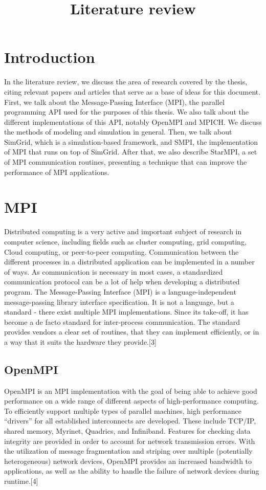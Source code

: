 \documentclass[a4paper]{article}
\begin{document}
\title{Literature review}
\maketitle
\section{Introduction}
In the literature review, we discuss the area of research covered by
the thesis, citing relevant papers and articles that serve as a base
of ideas for this document.\\
First, we talk about the Message-Passing Interface (MPI), the parallel
programming API used for the purposes of this thesis. We also talk
about the different implementations of this API, notably OpenMPI and
MPICH. We discuss the methods of modeling and simulation in general.
Then, we talk about SimGrid, which is a simulation-based
framework, and SMPI, the implementation of MPI that runs on top of
SimGrid. After that, we also describe StarMPI, a set of MPI
communication routines, presenting a technique that can improve the
performance of MPI applications.
\section{MPI}
Distributed computing is a very active and important subject of research
in computer science, including fields such as cluster computing, grid
computing, Cloud computing, or peer-to-peer computing. Communication
between the different processes in a distributed application can be
implemented in a number of ways. As communication is necessary in most
cases, a standardized communication protocol can be a lot of help when
developing a distributed program. The Message-Passing Interface (MPI)
is a language-independent message-passing library
interface specification. It is not a language, but a standard - there
exist multiple MPI implementations. Since its take-off, it has become
a de facto standard for inter-process communication. The standard
provides vendors a clear set of routines, that they can implement
efficiently, or in a way that it suits the hardware they provide.[3]
\subsection{OpenMPI}
OpenMPI is an MPI implementation with the goal of being able to
achieve good performance on a wide range of different aspects of
high-performance computing. To efficiently support multiple types of
parallel machines, high performance “drivers” for all established
interconnects are developed. These include TCP/IP, shared memory,
Myrinet, Quadrics, and Infiniband. Features for checking data
integrity are provided in order to account for network transmission
errors. With the utilization of message fragmentation and striping
over multiple (potentially heterogeneous) network devices, OpenMPI
provides an increased bandwidth to applications, as well as the
ability to handle the failure of network devices during runtime.[4]
\end{document}
